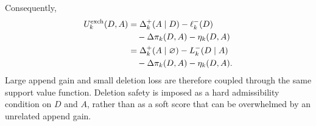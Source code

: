 \documentclass[
  reprint,
  amsmath,
  amssymb,
  aps,
  pra,
  nofootinbib,
  superscriptaddress,
  floatfix
]{revtex4-2}
\begin{document}
Consequently,
\begin{equation}
\begin{aligned}
U_k^{\rm exch}(D,A)
&=
\Delta_k^{+}(A\mid D)-\ell_k^{-}(D)\\
&\quad
-\Delta\pi_k(D,A)-\eta_k(D,A)\\
&=
\Delta_k^{+}(A\mid\varnothing)-L_k^{-}(D\mid A)\\
&\quad
-\Delta\pi_k(D,A)-\eta_k(D,A).
\end{aligned}
\label{eq:exchange_value_decomposition}
\end{equation}
Large append gain and small deletion loss are therefore coupled through the same
support value function.  Deletion safety is imposed as a hard admissibility
condition on \(D\) and \(A\), rather than as a soft score that can be overwhelmed
by an unrelated append gain.
\end{document}
